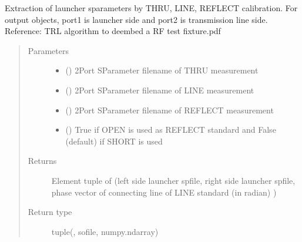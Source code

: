 \documentclass[letterpaper,10pt,english]{sphinxmanual}
\begin{document}

\begin{fulllineitems}
\label{\detokenize{touchstone:touchstone.trl_launcher_extraction}}
Extraction of launcher s\sphinxhyphen{}parameters by THRU, LINE, REFLECT calibration. For output  objects, port\sphinxhyphen{}1 is launcher side and port\sphinxhyphen{}2 is transmission line side.
Reference: TRL algorithm to de\sphinxhyphen{}embed a RF test fixture.pdf
\begin{quote}\begin{description}
\item[{Parameters}] \leavevmode\begin{itemize}
\item {} 
 () \textendash{} 2\sphinxhyphen{}Port S\sphinxhyphen{}Parameter filename of THRU measurement

\item {} 
 () \textendash{} 2\sphinxhyphen{}Port S\sphinxhyphen{}Parameter filename of LINE measurement

\item {} 
 () \textendash{} 2\sphinxhyphen{}Port S\sphinxhyphen{}Parameter filename of REFLECT measurement

\item {} 
 () \textendash{} True if OPEN is used as REFLECT standard and False (default) if SHORT is used

\end{itemize}

\item[{Returns}] \sphinxhyphen{}Element tuple of (left side launcher spfile, right side launcher spfile, phase vector of connecting line of LINE standard (in radian) )

\item[{Return type}] \leavevmode
tuple({\hyperref[\detokenize{touchstone:touchstone.spfile}]{}}, sofile, numpy.ndarray)

\end{description}\end{quote}

\end{fulllineitems}
\end{document}
